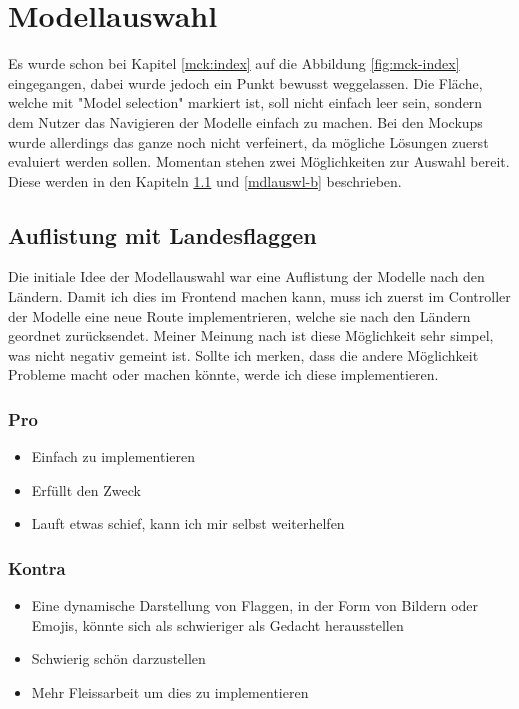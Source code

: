 \section{Modellauswahl}
Es wurde schon bei Kapitel \ref{mck:index} auf die Abbildung \ref{fig:mck-index} eingegangen, dabei wurde jedoch ein Punkt bewusst weggelassen. Die Fläche, welche mit "Model selection" markiert ist, soll nicht einfach leer sein, sondern dem Nutzer das Navigieren der Modelle einfach zu machen.
\newline
Bei den Mockups wurde allerdings das ganze noch nicht verfeinert, da mögliche Lösungen zuerst evaluiert werden sollen. Momentan stehen zwei Möglichkeiten zur Auswahl bereit. Diese werden in den Kapiteln \ref{mdlauswl-a} und \ref{mdlauswl-b} beschrieben.
\subsection{Auflistung mit Landesflaggen} \label{mdlauswl-a}
Die initiale Idee der Modellauswahl war eine Auflistung der Modelle nach den Ländern. Damit ich dies im Frontend machen kann, muss ich zuerst im Controller der Modelle eine neue Route implementrieren, welche sie nach den Ländern geordnet zurücksendet.
\newline
Meiner Meinung nach ist diese Möglichkeit sehr simpel, was nicht negativ gemeint ist. Sollte ich merken, dass die andere Möglichkeit Probleme macht oder machen könnte, werde ich diese implementieren.
\subsubsection{Pro}
\begin{itemize}
  \item Einfach zu implementieren
  \item Erfüllt den Zweck
  \item Lauft etwas schief, kann ich mir selbst weiterhelfen
\end{itemize}
\subsubsection{Kontra}
\begin{itemize}
  \item Eine dynamische Darstellung von Flaggen, in der Form von Bildern oder Emojis, könnte sich als schwieriger als Gedacht herausstellen
  \item Schwierig schön darzustellen
  \item Mehr Fleissarbeit um dies zu implementieren
\end{itemize}
